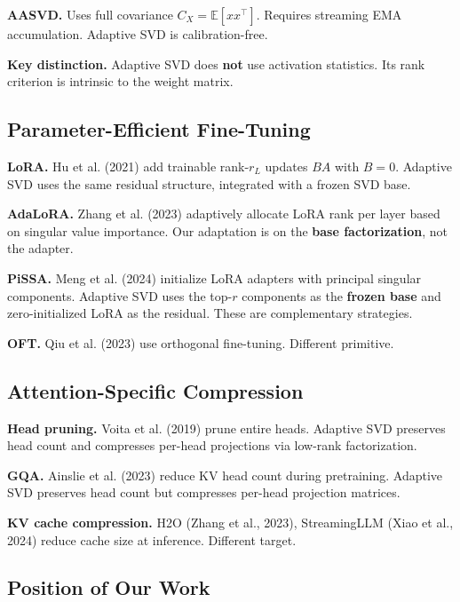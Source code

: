 \textbf{AASVD.} Uses full covariance $C_X = \mathbb{E}[x x^\top]$. Requires 
streaming EMA accumulation. Adaptive SVD is calibration-free.

\textbf{Key distinction.} Adaptive SVD does \textbf{not} use activation statistics. Its 
rank criterion is intrinsic to the weight matrix.

\subsection{Parameter-Efficient Fine-Tuning}

\textbf{LoRA.} Hu et al. (2021) add trainable rank-$r_L$ updates $B A$ with $B = 0$. 
Adaptive SVD uses the same residual structure, integrated with a frozen SVD base.

\textbf{AdaLoRA.} Zhang et al. (2023) adaptively allocate LoRA rank per layer based 
on singular value importance. Our adaptation is on the \textbf{base factorization}, 
not the adapter.

\textbf{PiSSA.} Meng et al. (2024) initialize LoRA adapters with principal singular 
components. Adaptive SVD uses the top-$r$ components as the \textbf{frozen base} 
and zero-initialized LoRA as the residual. These are complementary strategies.

\textbf{OFT.} Qiu et al. (2023) use orthogonal fine-tuning. Different primitive.

\subsection{Attention-Specific Compression}

\textbf{Head pruning.} Voita et al. (2019) prune entire heads. Adaptive SVD preserves 
head count and compresses per-head projections via low-rank factorization.

\textbf{GQA.} Ainslie et al. (2023) reduce KV head count during pretraining. Adaptive 
SVD preserves head count but compresses per-head projection matrices.

\textbf{KV cache compression.} H2O (Zhang et al., 2023), StreamingLLM (Xiao et al., 
2024) reduce cache size at inference. Different target.

\subsection{Position of Our Work}

